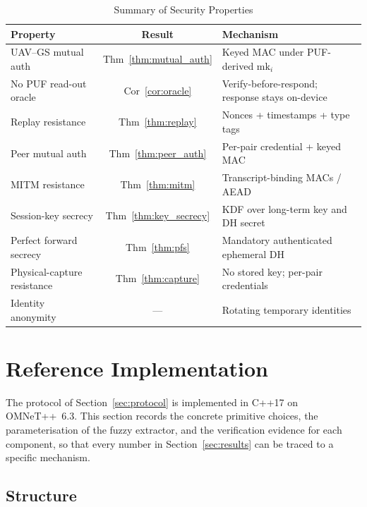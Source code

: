 \documentclass[11pt,a4paper]{article}
\begin{document}
\begin{table}[H]
\centering
\caption{Summary of Security Properties}
\label{tab:security_summary}
\begin{tabular}{@{}p{4.6cm}cp{6.0cm}@{}}
\toprule
\textbf{Property} & \textbf{Result} & \textbf{Mechanism} \\
\midrule
UAV--GS mutual auth & Thm~\ref{thm:mutual_auth} & Keyed MAC under PUF-derived $\text{mk}_i$ \\
No PUF read-out oracle & Cor~\ref{cor:oracle} & Verify-before-respond; response stays on-device \\
Replay resistance & Thm~\ref{thm:replay} & Nonces + timestamps + type tags \\
Peer mutual auth & Thm~\ref{thm:peer_auth} & Per-pair credential + keyed MAC \\
MITM resistance & Thm~\ref{thm:mitm} & Transcript-binding MACs / AEAD \\
Session-key secrecy & Thm~\ref{thm:key_secrecy} & KDF over long-term key and DH secret \\
Perfect forward secrecy & Thm~\ref{thm:pfs} & Mandatory authenticated ephemeral DH \\
Physical-capture resistance & Thm~\ref{thm:capture} & No stored key; per-pair credentials \\
Identity anonymity & --- & Rotating temporary identities \\
\bottomrule
\end{tabular}
\end{table}

\section{Reference Implementation}
\label{sec:implementation}

The protocol of Section~\ref{sec:protocol} is implemented in C++17 on
OMNeT++~6.3. This section records the concrete primitive choices, the
parameterisation of the fuzzy extractor, and the verification evidence for each
component, so that every number in Section~\ref{sec:results} can be traced to a
specific mechanism.

\subsection{Structure}
\end{document}
